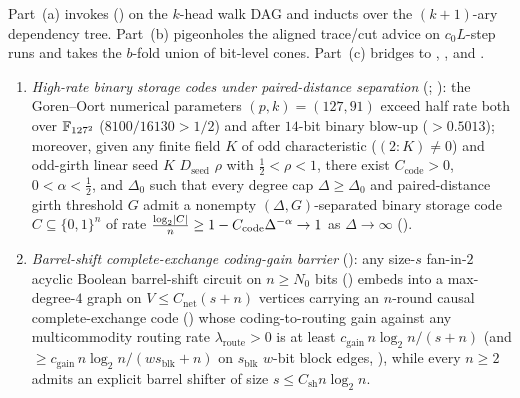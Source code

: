 \begin{outline}
Part~(a) invokes  (\cite{BoundedStack2026}) on the $k$-head walk
DAG and inducts over the $(k+1)$-ary dependency tree. Part~(b) pigeonholes the aligned trace/cut
advice on $c_0 L$-step runs and takes the $b$-fold union of bit-level cones. Part~(c) bridges to
,
, and
.
\end{outline}

\begin{proposition}\label{prop:diag-high-rate}
\begin{enumerate}[label=(\alph*)]
\item \emph{High-rate binary storage codes under paired-distance separation}
  (\cite[Theorem~7.1 and Corollary~8.2]{StorageCodes2026}; \cite[Definition~5.1, Theorem~5.5, and
  Theorem~6.1]{HighRate2026}): the Goren--Oort numerical parameters $(p, k) = (127, 91)$ exceed half
  rate both over $\mathbb{F}_{127^2}$ ($8100/16130 > 1/2$) and after $14$-bit binary blow-up ($> 0.5013$);
  moreover, given any finite field $K$ of odd characteristic ($(2 : K) \ne 0$) and odd-girth linear
  seed  $K$ $D_{\mathrm{seed}}$ $\rho$ with $\frac{1}{2} < \rho < 1$,
  there exist $C_{\mathrm{code}} > 0$, $0 < \alpha < \frac{1}{2}$, and $\Delta_0$ such that every
  degree cap $\Delta \ge \Delta_0$ and paired-distance girth threshold $G$ admit a nonempty
  $(\Delta, G)$-separated binary storage code $C \subseteq \{0,1\}^n$ of rate
  $\frac{\log_2\lvert C \rvert}{n} \ge 1 - C_{\mathrm{code}}\Delta^{-\alpha} \to 1$ as $\Delta \to \infty$
  ().
\item \emph{Barrel-shift complete-exchange coding-gain barrier}
  (\cite[Propositions~11.2 and~11.3]{FirstPaper2026}): any size-$s$ fan-in-$2$ acyclic Boolean
  barrel-shift circuit on $n \ge N_0$ bits () embeds into a max-degree-$4$
  graph on $V \le C_{\mathrm{net}}(s + n)$ vertices carrying an $n$-round causal complete-exchange
  code () whose coding-to-routing gain against any multicommodity
  routing rate $\lambda_{\mathrm{route}} > 0$ is at least
  $c_{\mathrm{gain}}\,n\log_2 n / (s + n)$ (and $\ge c_{\mathrm{gain}}\,n\log_2 n / (w s_{\mathrm{blk}} + n)$
  on $s_{\mathrm{blk}}$ $w$-bit block edges, ), while
  every $n \ge 2$ admits an explicit barrel shifter of size $s \le C_{\mathrm{sh}} n\log_2 n$.
\end{enumerate}
\end{proposition}
